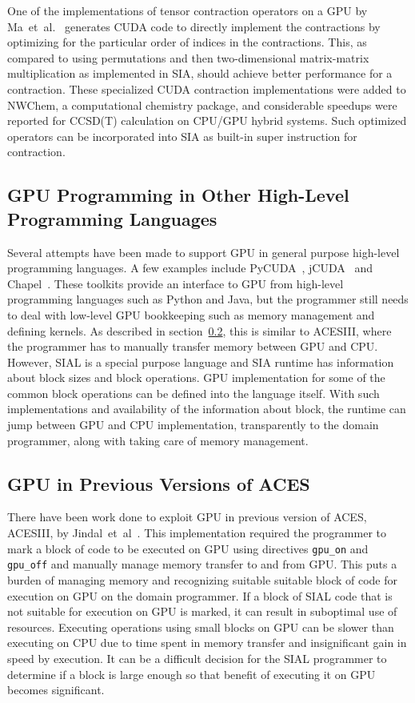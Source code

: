 One of the implementations of tensor contraction operators on a GPU by
Ma~et~al.~\cite{Ma2013} generates CUDA code to directly implement the contractions
by optimizing for the particular order of indices in the contractions. This, as
compared to using permutations and then two-dimensional matrix-matrix multiplication
as implemented in SIA, should achieve better performance for a contraction. These
specialized CUDA contraction implementations were added to NWChem, a computational
chemistry package, and considerable speedups were reported for CCSD(T) calculation
on CPU/GPU hybrid systems. Such optimized operators can be incorporated into SIA
as built-in super instruction for contraction.

\subsection{GPU Programming in Other High-Level Programming Languages}
Several attempts have been made to support GPU in general purpose high-level programming
languages. A few examples include PyCUDA~\cite{pycuda2011},
jCUDA~\cite{jcuda2009} and Chapel~\cite{chapelgpu}. These toolkits provide an interface
to GPU from high-level programming languages such as Python and Java, but the
programmer still needs to deal with low-level GPU bookkeeping such as memory
management and defining kernels. As described in section~\ref{relatedworkacesiiigpu},
this is similar to ACESIII, where the programmer has to manually transfer memory
between GPU and CPU. However, SIAL is a special purpose language and SIA runtime
has information about block sizes and block operations. GPU implementation for
some of the common block operations can be defined into the language itself. With
such implementations and availability of the information about block, the runtime can jump between
GPU and CPU implementation, transparently to the domain programmer, along with taking
care of memory management.

\subsection{GPU in Previous Versions of ACES}\label{relatedworkacesiiigpu}
There have been work done to exploit GPU in previous version of ACES, ACESIII,
by Jindal~et~al~\cite{Jindal2016}. This implementation
required the programmer to mark a block of code to be executed on GPU using
directives \texttt{gpu\_on} and \texttt{gpu\_off} and manually manage memory
transfer to and from GPU. This puts a burden of managing memory and recognizing
suitable suitable block of code for execution on GPU on the domain programmer.
If a block of SIAL code that is not suitable for execution on GPU is marked, it can result
in suboptimal use of resources. Executing operations using small blocks on GPU can
be slower than executing on CPU due to time spent in memory transfer and
insignificant gain in speed by execution. It can be a difficult decision for the
SIAL programmer to determine if a block is large enough so that benefit of executing
it on GPU becomes significant.

